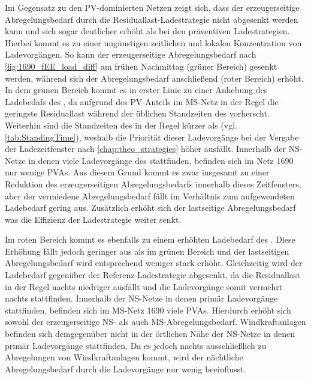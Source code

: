 Im Gegensatz zu den \gls{PV}-dominierten Netzen zeigt sich, dass der erzeugerseitige Abregelungsbedarf durch die Residuallast-Ladestrategie nicht abgesenkt werden kann und sich sogar deutlicher erhöht als bei den präventiven Ladestrategien.
Hierbei kommt es zu einer ungünstigen zeitlichen und lokalen Konzentration von Ladevorgängen.
So kann der erzeugerseitige Abregelungsbedarf nach \autoref{fig:1690_fEE_load_diff} am frühen Nachmittag (grüner Bereich) gesenkt werden, während sich der Abregelungsbedarf anschließend (roter Bereich) erhöht.
In dem grünen Bereich kommt es in erster Linie zu einer Anhebung des Ladebedafs des \UC \Firmeparkplatzdot, da aufgrund des \gls{PV}-Anteils im \gls{MS}-Netz in der Regel die geringste Residuallast während der üblichen Standzeiten des \UC \Firmeparkplatz vorherscht.
Weiterhin sind die Standzeiten des \UC \Firmeparkplatz in der Regel kürzer als \zH (vgl. \autoref{tab:StandingTime}), weshalb die Priorität dieser Ladevorgänge bei der Vergabe der Ladezeitfenster nach \autoref{chap:theo_strategies} höher ausfällt.
Innerhalb der \gls{NS}-Netze in denen viele Ladevorgänge des \UC \Firmeparkplatz stattfinden, befinden sich im Netz \num{1690} nur wenige \glspl{PVA}.
Aus diesem Grund kommt es zwar insgesamt zu einer Reduktion des erzeugerseitigen Abregelungsbedarfs innerhalb dieses Zeitfensters, aber der vermiedene Abregelungsbedarf fällt im Verhältnis zum aufgewendeten Ladebedarf gering aus.
Zusätzlich erhöht sich der lastseitige Abregelungsbedarf was die Effizienz der Ladestrategie weiter senkt.



Im roten Bereich kommt es ebenfalls zu einem erhöhten Ladebedarf des \UC \Firmeparkplatzdot.
Diese Erhöhung fällt jedoch geringer aus als im grünen Bereich und der lastseitigen Abregelungsbedarf wird entsprechend weniger stark erhöht.
Gleichzeitig wird der Ladebedarf \zH gegenüber der Referenz-Ladestrategie abgesenkt, da die Residuallast in der Regel nachts niedriger ausfällt und die Ladevorgänge \zH somit vermehrt nachts stattfinden.
Innerhalb der \gls{NS}-Netze in denen primär Ladevorgänge \zH stattfinden, befinden sich im \gls{MS}-Netz \num{1690} viele \glspl{PVA}.
Hierdurch erhöht sich sowohl der erzeugerseitige \gls{NS}- als auch \gls{MS}-Abregelungsbedarf.
Windkraftanlagen befinden sich demgegenüber nicht in der örtlichen Nähe der \gls{NS}-Netze in denen primär Ladevorgänge \zH stattfinden.
Da es jedoch nachts ausschließlich zu Abregelungen von Windkraftanlagen kommt, wird der nächtliche Abregelungsbedarf durch die Ladevorgänge nur wenig beeinflusst.


